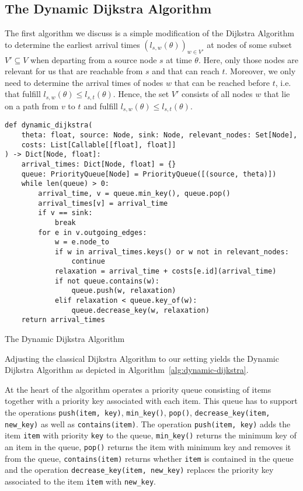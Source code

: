 \subsection{The Dynamic Dijkstra Algorithm}

The first algorithm we discuss is a simple modification of the Dijkstra Algorithm to determine the earliest arrival times $(l_{s,w}(\theta))_{w\in V'}$ at nodes of some subset $V'\subseteq V$ when departing from a source node $s$ at time $\theta$.
Here, only those nodes are relevant for us that are reachable from $s$ and that can reach $t$.
Moreover, we only need to determine the arrival times of nodes $w$ that can be reached before $t$, i.e. that fulfill $l_{s,w}(\theta) \leq l_{s,t}(\theta)$.
Hence, the set $V'$ consists of all nodes $w$ that lie on a path from $v$ to $t$ and fulfill $l_{s,w}(\theta) \leq l_{s,t}(\theta)$.

\begin{algorithm}[h]
\begin{verbatim}
def dynamic_dijkstra(
    theta: float, source: Node, sink: Node, relevant_nodes: Set[Node],
    costs: List[Callable[[float], float]]
) -> Dict[Node, float]:
    arrival_times: Dict[Node, float] = {}
    queue: PriorityQueue[Node] = PriorityQueue([(source, theta)])
    while len(queue) > 0:
        arrival_time, v = queue.min_key(), queue.pop()
        arrival_times[v] = arrival_time
        if v == sink:
            break
        for e in v.outgoing_edges:
            w = e.node_to
            if w in arrival_times.keys() or w not in relevant_nodes:
                continue
            relaxation = arrival_time + costs[e.id](arrival_time)
            if not queue.contains(w):
                queue.push(w, relaxation)
            elif relaxation < queue.key_of(w):
                queue.decrease_key(w, relaxation)
    return arrival_times
\end{verbatim}
\caption{The Dynamic Dijkstra Algorithm}
\label{alg:dynamic-dijkstra}
\end{algorithm}

Adjusting the classical Dijkstra Algorithm to our setting yields the Dynamic Dijkstra Algorithm as depicted in Algorithm~\ref{alg:dynamic-dijkstra}.

At the heart of the algorithm operates a priority queue consisting of items together with a priority key associated with each item.
This queue has to support the operations \texttt{push(item, key)}, \texttt{min\_key()}, \texttt{pop()}, \texttt{decrease\_key(item, new\_key)} as well as \texttt{contains(item)}.
The operation \texttt{push(item, key)} adds the item \texttt{item} with priority \texttt{key} to the queue, \texttt{min\_key()} returns the minimum key of an item in the queue, \texttt{pop()} returns the item with minimum key and removes it from the queue, \texttt{contains(item)} returns whether \texttt{item} is contained in the queue and the operation \texttt{decrease\_key(item, new\_key)} replaces the priority key associated to the item \texttt{item} with \texttt{new\_key}.


